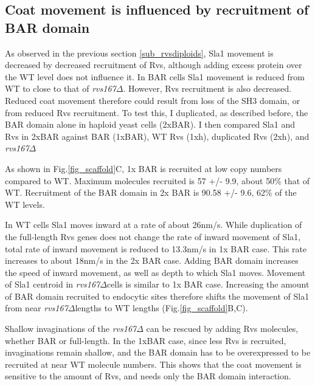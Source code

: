 	\subsection{Coat movement is influenced by recruitment of BAR domain }
As observed in the previous section  \ref{sub_rvsdiploids}, Sla1 movement is decreased by decreased recruitment of Rvs, although adding excess protein over the WT level does not influence it. In BAR cells Sla1 movement is reduced from WT to close to that of \textit{rvs167$\Delta$}. However, Rvs recruitment is also decreased. Reduced coat movement therefore could result from loss of the SH3 domain, or from reduced Rvs recruitment. To test this, I duplicated, as described before, the BAR domain alone in haploid yeast cells (2xBAR). I then compared Sla1 and Rvs in 2xBAR against BAR (1xBAR), WT Rvs (1xh), duplicated Rvs (2xh), and \textit{rvs167$\Delta$}


 As shown in Fig.\ref{fig_scaffold}C, 1x BAR is recruited at low copy numbers compared to WT. Maximum molecules recruited is 57 +/- 9.9, about 50\% that of WT. Recruitment of the BAR domain in 2x BAR is 90.58 +/- 9.6, 62\% of the WT levels. 
 

In WT cells Sla1 moves inward at a rate of about 26nm/s. While duplication of the full-length Rvs genes does not change the rate of inward movement of Sla1, total rate of inward movement is reduced to 13.3nm/s in 1x BAR case. This rate increases to about 18nm/s in the 2x BAR case. Adding BAR domain increases the speed of inward movement, as well as depth to which Sla1 moves. Movement of Sla1 centroid in \textit{rvs167$\Delta$}cells is similar to 1x BAR case. Increasing the amount of BAR domain recruited to endocytic sites therefore shifts the movement of Sla1 from near \textit{rvs167$\Delta$}lengths to WT lengths (Fig.\ref{fig_scaffold}B,C).

Shallow invaginations of the \textit{rvs167$\Delta$} can be rescued by adding Rvs molecules, whether BAR or full-length. In the 1xBAR case, since less Rvs is recruited, invaginations remain shallow, and the BAR domain has to be overexpressed to be recruited at near WT molecule numbers.
This shows that the coat movement is sensitive to the amount of Rvs, and needs only the BAR domain interaction.



